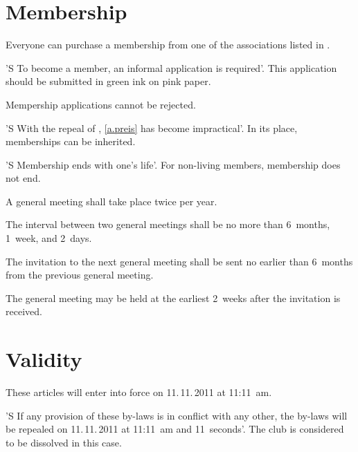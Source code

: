 \documentclass[fontsize=12pt,pagesize,parskip=half]
              {scrartcl}
\begin{document}
\section{Membership}

\begin{contract}


Everyone can purchase a membership from one of the
associations listed in .\label{a.preis}

'S To become a member, an informal application is
required'. This application should be submitted in green
ink on pink paper.

Mempership applications cannot be rejected.


'S With the repeal of ,
\ref{a.preis} has become impractical'. In its place,
memberships can be inherited.


'S Membership ends with one's life'. For non-living
members, membership does not end.


A general meeting shall take place twice per year.

The interval between two general meetings shall be
no more than 6~months, 1~week, and 2~days.

The invitation to the next general meeting shall be sent
no earlier than 6~months from the previous general
meeting.


The general meeting may be held at the earliest 2~weeks after
the invitation is received.
\end{contract}

\section{Validity}

\begin{contract}

These articles will enter into force on 11.\,11.\,2011 at
11:11~am.

'S If any provision of these by-laws is in conflict with
any other, the by-laws will be repealed on
11.\,11.\,2011 at 11:11~am and 11~seconds'. The club is
considered to be dissolved in this case.

\end{contract}
\end{document}
